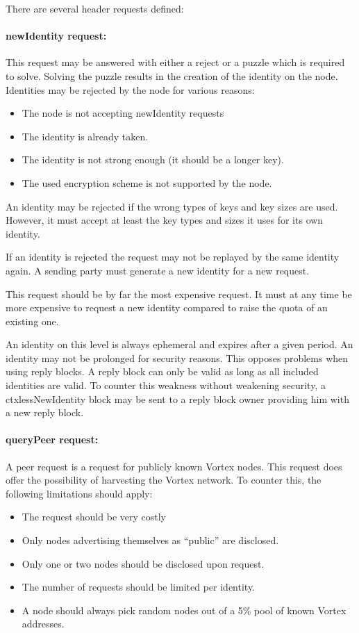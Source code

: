 There are several header requests defined:

\paragraph{newIdentity request:} This request may be answered with either a reject or a puzzle which is required to solve. Solving the puzzle results in the creation of the identity on the node. Identities may be rejected by the node for various reasons:

\begin{itemize}
	\item The node is not accepting newIdentity requests
	\item The identity is already taken.
	\item The identity is not strong enough (it should be a longer key).
	\item The used encryption scheme is not supported by the node.
\end{itemize}

An identity may be rejected if the wrong types of keys and key sizes are used. However, it must accept at least the key types and sizes it uses for its own identity.

If an identity is rejected the request may not be replayed by the same identity again. A sending party must generate a new identity for a new request. 

This request should be by far the most expensive request. It must at any time be more expensive to request a new identity compared to raise the quota of an existing one.

An identity on this level is always ephemeral and expires after a given period. An identity may not be prolonged for security reasons. This opposes problems when using reply blocks. A reply block can only be valid as long as all included identities are valid. To counter this weakness without weakening security, a ctxlessNewIdentity block may be sent to a reply block owner providing him with a new reply block.

\paragraph{queryPeer request:} A peer request is a request for publicly known Vortex nodes. This request does offer the possibility of harvesting the Vortex network. To counter this, the following limitations should apply:
\begin{itemize}
	\item The request should be very costly
	\item Only nodes advertising themselves as ``public'' are disclosed.
	\item Only one or two nodes should be disclosed upon request.
	\item The number of requests should be limited per identity.
	\item A node should always pick random nodes out of a 5\% pool of known Vortex addresses.
\end{itemize}

